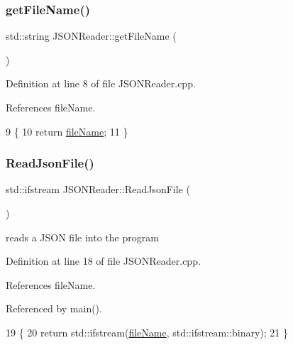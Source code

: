 \subsubsection{\texorpdfstring{get\+File\+Name()}{getFileName()}}
{\footnotesize\ttfamily std\+::string J\+S\+O\+N\+Reader\+::get\+File\+Name (\begin{DoxyParamCaption}{ }\end{DoxyParamCaption})}



Definition at line 8 of file J\+S\+O\+N\+Reader.\+cpp.



References file\+Name.


\begin{DoxyCode}
9 \{
10     \textcolor{keywordflow}{return} \hyperlink{class_j_s_o_n_reader_abae0923ae887d87350b9ca1ddd56d41e}{fileName};
11 \}
\end{DoxyCode}
\mbox{\label{class_j_s_o_n_reader_a47c90ec12638eed9ea96feefc76096e1}} 
\subsubsection{\texorpdfstring{Read\+Json\+File()}{ReadJsonFile()}}
{\footnotesize\ttfamily std\+::ifstream J\+S\+O\+N\+Reader\+::\+Read\+Json\+File (\begin{DoxyParamCaption}{ }\end{DoxyParamCaption})}



reads a J\+S\+ON file into the program 



Definition at line 18 of file J\+S\+O\+N\+Reader.\+cpp.



References file\+Name.



Referenced by main().


\begin{DoxyCode}
19 \{
20     \textcolor{keywordflow}{return} std::ifstream(\hyperlink{class_j_s_o_n_reader_abae0923ae887d87350b9ca1ddd56d41e}{fileName}, std::ifstream::binary);
21 \}
\end{DoxyCode}
\mbox{\label{class_j_s_o_n_reader_ac9652f637597153cffe536fd2112c4f2}} 

